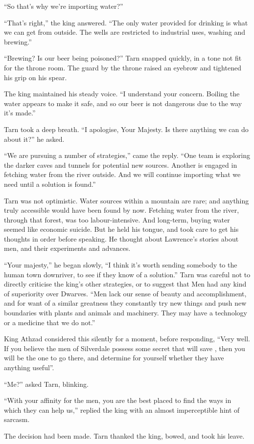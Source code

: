 ``So that's why we're importing water?''

``That's right,'' the king answered.  ``The only water provided for drinking is what we can get from outside.  The wells are restricted to industrial uses, washing and brewing.''

``Brewing?  Is our beer being poisoned?'' Tarn snapped quickly, in a tone not fit for the throne room.  The guard by the throne raised an eyebrow and tightened his grip on his spear.

The king maintained his steady voice.  ``I understand your concern.  Boiling the water appears to make it safe, and so our beer is not dangerous due to the way it's made.''

Tarn took a deep breath.  ``I apologise, Your Majesty.  Is there anything we can do about it?'' he asked.

``We are pursuing a number of strategies,'' came the reply.  ``One team is exploring the darker caves and tunnels for potential new sources.  Another is engaged in fetching water from the river outside.  And we will continue importing what we need until a solution is found.''

Tarn was not optimistic.  Water sources within a mountain are rare; and anything truly accessible would have been found by now.  Fetching water from the river, through that forest, was too labour-intensive.  And long-term, buying water seemed like economic suicide.  But he held his tongue, and took care to get his thoughts in order before speaking.  He thought about Lawrence's stories about men, and their experiments and advances.

``Your majesty,'' he began slowly, ``I think it's worth sending somebody to the human town downriver, to see if they know of a solution.''  Tarn was careful not to directly criticise the king's other strategies, or to suggest that Men had any kind of superiority over Dwarves.
``Men lack our sense of beauty and accomplishment, and for want of a similar greatness they constantly try new things and push new boundaries with plants and animals and machinery.  They may have a technology or a medicine that we do not.''

King Athzad considered this silently for a moment, before responding, ``Very well.  If you believe the men of Silverdale possess some secret that will save \korbarthrond, then you will be the one to go there, and determine for yourself whether they have anything useful''.

``Me?'' asked Tarn, blinking.

``With your affinity for the men, you are the best placed to find the ways in which they can help us,'' replied the king with an almost imperceptible hint of sarcasm.

The decision had been made.  Tarn thanked the king, bowed, and took his leave.